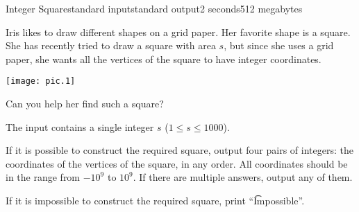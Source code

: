 \begin{problem}{Integer Square}{standard input}{standard output}{2 seconds}{512 megabytes}

Iris likes to draw different shapes on a grid paper. Her favorite shape is a square. She has recently tried to draw a square with area $s$, but since she uses a grid paper, she wants all the vertices of the square to have integer coordinates.

\begin{center}
\texttt{[image: pic.1]}
\end{center}

Can you help her find such a square?

\InputFile
The input contains a single integer $s$ ($1\le s\le 1000$).

\OutputFile
If it is possible to construct the required square, output four pairs of integers: the coordinates of the vertices of the square, in any order. All coordinates should be in the range from $-10^9$ to $10^9$. If there are multiple answers, output any of them.

If it is impossible to construct the required square, print ``\t{Impossible}''.

\Examples

\begin{example}
%
%
\end{example}

\end{problem}

